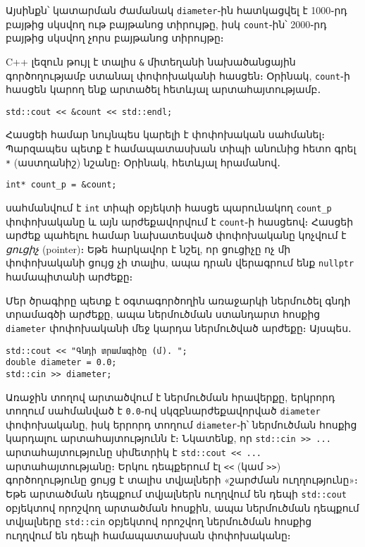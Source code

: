 
Այսինքն՝ կատարման ժամանակ \texttt{diameter}֊ին հատկացվել է 1000֊րդ բայթից 
սկսվող ութ բայթանոց տիրույթը, իսկ \texttt{count}֊ին՝ 2000֊րդ բայթից սկսվող 
չորս բայթանոց տիրույթը։

C++ լեզուն թույլ է տալիս \verb|&| միտեղանի նախածանցային գործողությամբ 
ստանալ փոփոխականի հասցեն։ Օրինակ, \texttt{count}֊ի հասցեն կարող ենք արտածել 
հետևյալ արտահայտությամբ․

\begin{Verbatim}
std::cout << &count << std::endl;
\end{Verbatim}

Հասցեի համար նույնպես կարելի է փոփոխական սահմանել։ Պարզապես պետք է 
համապատասխան տիպի անունից հետո գրել \verb|*| (աստղանիշ) նշանը։ Օրինակ, 
հետևյալ հրամանով․

\begin{Verbatim}
int* count_p = &count;
\end{Verbatim}

\noindent սահմանվում է \texttt{int} տիպի օբյեկտի հասցե պարունակող 
\texttt{count\_p} փոփոխականը և այն արժեքավորվում է \texttt{count}֊ի 
հասցեով։ Հասցեի արժեք պահելու համար նախատեսված փոփոխականը կոչվում է 
\emph{ցուցիչ} (pointer)։ Եթե հարկավոր է նշել, որ ցուցիչը ոչ մի 
փոփոխականի ցույց չի տալիս, ապա դրան վերագրում ենք \texttt{nullptr} 
համապիտանի արժեքը։

Մեր ծրագիրը պետք է օգտագործողին առաջարկի ներմուծել գնդի տրամագծի 
արժեքը, ապա ներմուծման ստանդարտ հոսքից \texttt{diameter} փոփոխականի 
մեջ կարդա ներմուծված արժեքը։ Այսպես․

\begin{Verbatim}
std::cout << "Գնդի տրամագիծը (մ). ";
double diameter = 0.0;
std::cin >> diameter;
\end{Verbatim}

Առաջին տողով արտածվում է ներմուծման հրավերքը, երկրորդ տողում սահմանված 
է \texttt{0.0}֊ով սկզբնարժեքավորված \texttt{diameter} փոփոխականը, իսկ 
երրորդ տողում \texttt{diameter}֊ի՝ ներմուծման հոսքից կարդալու 
արտահայտությունն է։ Նկատենք, որ \verb|std::cin >> ...| արտահայտությունը 
սիմետրիկ է \verb|std::cout << ...| արտահայտությանը։ Երկու դեպքերում էլ 
\verb|<<| (կամ \verb|>>|) գործողությունը ցույց է տալիս տվյալների 
«շարժման ուղղությունը»։ Եթե արտածման դեպքում տվյալներն ուղղվում են 
դեպի \texttt{std::cout} օբյեկտով որոշվող արտածման հոսքին, ապա ներմուծման 
դեպքում տվյալները \texttt{std::cin} օբյեկտով որոշվող ներմուծման հոսքից 
ուղղվում են դեպի համապատասխան փոփոխականը։

